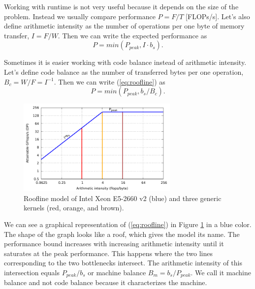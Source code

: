 Working with runtime is not very useful because it depends on the size of the problem. Instead we usually compare performance $P=F/T$ [FLOPs/s].
Let's also define arithmetic intensity as the number of operations per one byte of memory transfer, $I=F/W$. Then we can write the expected performance as
\begin{equation}
   P = min(P_{peak}, I \cdot b_s). \label{eq:roofline}
\end{equation}

Sometimes it is easier working with code balance instead of arithmetic intensity. Let's define code balance as the number of transferred bytes per one operation,\\ $B_c=W/F=I^{-1}$. Then we can write (\ref{eq:roofline}) as
\begin{equation}
   P = min(P_{peak}, b_s/B_c). \label{eq:roofline_balance}
\end{equation}

\begin{figure}[ht]
   \centering
   \includegraphics[width=0.7\textwidth,clip=true]{images/roofline/roofline_emmy_Xeon2660v2_naive.pdf}
   \caption{Roofline model of Intel Xeon E5-2660 v2 (blue) and three generic kernels (red, orange, and brown).}
  \label{fig:roofline_emmy_naive}
\end{figure}

We can see a graphical representation of (\ref{eq:roofline}) in Figure \ref{fig:roofline_emmy_naive} in a blue color. The shape of the graph looks like a roof, which gives the model its name.
The performance bound increases with increasing arithmetic intensity until it saturates at the peak performance. This happens where the two lines corresponding to the two bottlenecks intersect. The arithmetic intensity of this intersection equals $P_{peak}/b_s$ or machine balance $B_m=b_s/P_{peak}$. We call it machine balance and not code balance because it characterizes the machine.

